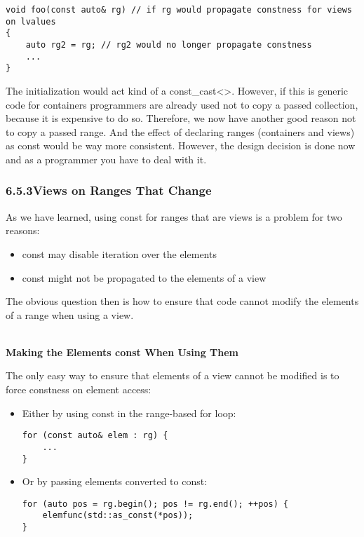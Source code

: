 \begin{lstlisting}[style=styleCXX]
void foo(const auto& rg) // if rg would propagate constness for views on lvalues
{
	auto rg2 = rg; // rg2 would no longer propagate constness
	...
}
\end{lstlisting}

The initialization would act kind of a const\_cast<>. However, if this is generic code for containers programmers are already used not to copy a passed collection, because it is expensive to do so. Therefore, we now have another good reason not to copy a passed range. And the effect of declaring ranges (containers and views) as const would be way more consistent. However, the design decision is done now and as a programmer you have to deal with it.

\subsubsection*{ 6.5.3\hspace{0.2cm}Views on Ranges That Change}

As we have learned, using const for ranges that are views is a problem for two reasons:

\begin{itemize}
\item
const may disable iteration over the elements

\item
const might not be propagated to the elements of a view
\end{itemize}

The obvious question then is how to ensure that code cannot modify the elements of a range when using a view.

\noindent
\hspace*{\fill} \\ %
\textbf{Making the Elements const When Using Them}

The only easy way to ensure that elements of a view cannot be modified is to force constness on element access:

\begin{itemize}
\item
Either by using const in the range-based for loop:

\begin{lstlisting}[style=styleCXX]
for (const auto& elem : rg) {
	...
}
\end{lstlisting}

\item
Or by passing elements converted to const:

\begin{lstlisting}[style=styleCXX]
for (auto pos = rg.begin(); pos != rg.end(); ++pos) {
	elemfunc(std::as_const(*pos));
}
\end{lstlisting}
\end{itemize}

